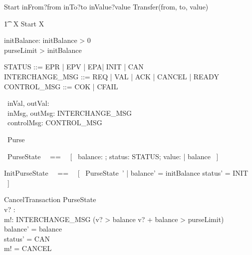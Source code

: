\documentclass{article}
\begin{document}
\begin{circusaction}
     Start \circdef inFrom?from \then inTo?to \then inValue?value \then Transfer(from, to, value)
\end{circusaction}

\begin{circusaction}
   \t1 \circspot \circmu\ X \circspot Start \circseq X
\end{circusaction}

\begin{circus}
   \circend
\end{circus}

\begin{axdef}
    initBalance: \nat
\where
    initBalance > 0 \\
    purseLimit > initBalance
\end{axdef}

\begin{zed}
    STATUS ::= EPR | EPV | EPA| INIT | CAN \\
    INTERCHANGE\_MSG ::= REQ | VAL | ACK | CANCEL | READY \\
    CONTROL\_MSG ::= COK | CFAIL
\end{zed}

\begin{circus}
      \circchannel\ inVal, outVal: \nat \\
      \circchannel\ inMsg, outMsg: INTERCHANGE\_MSG \\
      \circchannel\ controlMsg: CONTROL\_MSG
\end{circus}

\begin{circus}
    \circprocess\ Purse \circdef\ \circbegin
\end{circus}

\begin{circusaction}
     \circstate\ PurseState ~~==~~ [~ balance: \nat; status: STATUS; value: \nat | balance  ~]
\end{circusaction}

\begin{zed}
    InitPurseState ~~==~~ [~ PurseState~' | balance' = initBalance \land status' = INIT ~]
\end{zed}

\begin{schema}{CancelTransaction}
     \Delta PurseState \\
     v? : \nat \\
     m!: INTERCHANGE\_MSG
\where
     (v? > balance \lor v? + balance > purseLimit) \\
     balance' = balance \\
     status' = CAN \\
     m! = CANCEL
\end{schema}
\end{document}
